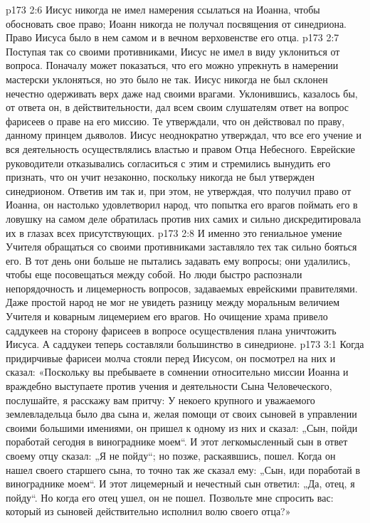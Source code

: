 \vs p173 2:6 \pc Иисус никогда не имел намерения ссылаться на Иоанна, чтобы обосновать свое право; Иоанн никогда не получал посвящения от синедриона. Право Иисуса было в нем самом и в вечном верховенстве его отца.
\vs p173 2:7 Поступая так со своими противниками, Иисус не имел в виду уклониться от вопроса. Поначалу может показаться, что его можно упрекнуть в намерении мастерски уклоняться, но это было не так. Иисус никогда не был склонен нечестно одерживать верх даже над своими врагами. Уклонившись, казалось бы, от ответа он, в действительности, дал всем своим слушателям ответ на вопрос фарисеев о праве на его миссию. Те утверждали, что он действовал по праву, данному принцем дьяволов. Иисус неоднократно утверждал, что все его учение и вся деятельность осуществлялись властью и правом Отца Небесного. Еврейские руководители отказывались согласиться с этим и стремились вынудить его признать, что он учит незаконно, поскольку никогда не был утвержден синедрионом. Ответив им так и, при этом, не утверждая, что получил право от Иоанна, он настолько удовлетворил народ, что попытка его врагов поймать его в ловушку на самом деле обратилась против них самих и сильно дискредитировала их в глазах всех присутствующих.
\vs p173 2:8 И именно это гениальное умение Учителя обращаться со своими противниками заставляло тех так сильно бояться его. В тот день они больше не пытались задавать ему вопросы; они удалились, чтобы еще посовещаться между собой. Но люди быстро распознали непорядочность и лицемерность вопросов, задаваемых еврейскими правителями. Даже простой народ не мог не увидеть разницу между моральным величием Учителя и коварным лицемерием его врагов. Но очищение храма привело саддукеев на сторону фарисеев в вопросе осуществления плана уничтожить Иисуса. А саддукеи теперь составляли большинство в синедрионе.
\vs p173 3:1 Когда придирчивые фарисеи молча стояли перед Иисусом, он посмотрел на них и сказал: «Поскольку вы пребываете в сомнении относительно миссии Иоанна и враждебно выступаете против учения и деятельности Сына Человеческого, послушайте, я расскажу вам притчу: У некоего крупного и уважаемого землевладельца было два сына и, желая помощи от своих сыновей в управлении своими большими имениями, он пришел к одному из них и сказал: „Сын, пойди поработай сегодня в винограднике моем“. И этот легкомысленный сын в ответ своему отцу сказал: „Я не пойду“; но позже, раскаявшись, пошел. Когда он нашел своего старшего сына, то точно так же сказал ему: „Сын, иди поработай в винограднике моем“. И этот лицемерный и нечестный сын ответил: „Да, отец, я пойду“. Но когда его отец ушел, он не пошел. Позвольте мне спросить вас: который из сыновей действительно исполнил волю своего отца?»
